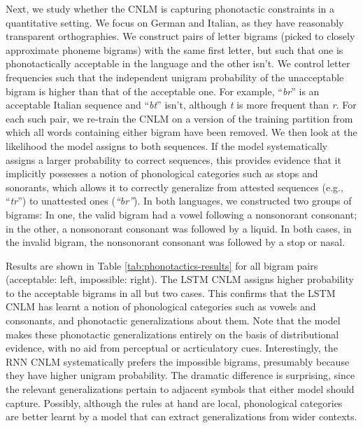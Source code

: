 Next, we study whether the CNLM is capturing phonotactic constraints
in a quantitative setting.  We focus on German and Italian, as they
have reasonably transparent orthographies.  We construct pairs of
letter bigrams (picked to closely approximate phoneme bigrams) with
the same first letter, but such that one is phonotactically acceptable
in the language and the other isn't. We control letter frequencies
such that the independent unigram probability of the unacceptable
bigram is higher than that of the acceptable one. For example,
``\emph{br}'' is an acceptable Italian sequence and ``\emph{bt}''
isn't, although \emph{t} is more frequent than \emph{r}.  For each
such pair, we re-train the CNLM on a version of the training partition
from which all words containing either bigram have been removed.  We
then look at the likelihood the model assigns to both sequences. If
the model systematically assigns a larger probability to correct
sequences, this provides evidence that it implicitly possesses a
notion of phonological categories such as stops and sonorants, which
allows it to correctly generalize from attested sequences (e.g.,
``\emph{tr}'') to unattested ones (\emph{``br''}). In both languages,
we constructed two groups of bigrams: In one, the valid bigram had a
vowel following a nonsonorant consonant; in the other, a nonsonorant consonant was followed by
a liquid.  In both cases, in the invalid bigram, the nonsonorant consonant was followed by a
stop or nasal.  %

Results are shown in Table \ref{tab:phonotactics-results} for all
bigram pairs (acceptable: left, impossible: right).  The LSTM CNLM
assigns higher probability to the acceptable bigrams in all but two
cases.  This confirms that the LSTM CNLM has learnt a notion of
phonological categories such as vowels and consonants, and phonotactic
generalizations about them.  Note that the model makes these
phonotactic generalizations entirely on the basis of distributional
evidence, with no aid from perceptual or acrticulatory
cues. Interestingly, the RNN CNLM systematically prefers the
impossible bigrams, presumably because they have higher unigram
probability. The dramatic difference is surprising, since the relevant
generalizations pertain to adjacent symbols that either model should
capture. Possibly, although the rules at hand are local, phonological
categories are better learnt by a model that can extract
generalizations from wider contexts.

